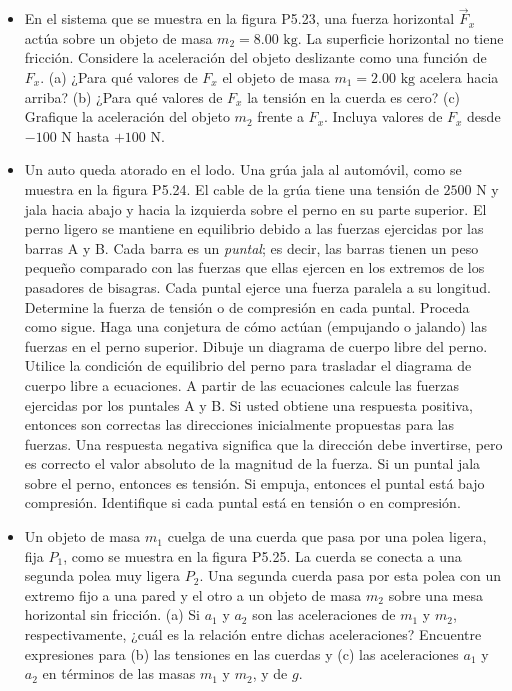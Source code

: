 \documentclass[11pt,a4paper]{article}
\begin{document}
\begin{itemize}
    \item[\textbf{23.}] En el sistema que se muestra en la figura P5.23, una fuerza horizontal $\vec{F}_x$ actúa sobre un objeto de masa $m_2 = 8.00 \text{ kg}$. La superficie horizontal no tiene fricción. Considere la aceleración del objeto deslizante como una función de $F_x$. (a) ¿Para qué valores de $F_x$ el objeto de masa $m_1 = 2.00 \text{ kg}$ acelera hacia arriba? (b) ¿Para qué valores de $F_x$ la tensión en la cuerda es cero? (c) Grafique la aceleración del objeto $m_2$ frente a $F_x$. Incluya valores de $F_x$ desde $-100 \text{ N}$ hasta $+100 \text{ N}$.
    \vspace*{7cm}

    \item[\textbf{24.}] Un auto queda atorado en el lodo. Una grúa jala al automóvil, como se muestra en la figura P5.24. El cable de la grúa tiene una tensión de $2500 \text{ N}$ y jala hacia abajo y hacia la izquierda sobre el perno en su parte superior. El perno ligero se mantiene en equilibrio debido a las fuerzas ejercidas por las barras A y B. Cada barra es un \textit{puntal}; es decir, las barras tienen un peso pequeño comparado con las fuerzas que ellas ejercen en los extremos de los pasadores de bisagras. Cada puntal ejerce una fuerza paralela a su longitud. Determine la fuerza de tensión o de compresión en cada puntal. Proceda como sigue. Haga una conjetura de cómo actúan (empujando o jalando) las fuerzas en el perno superior. Dibuje un diagrama de cuerpo libre del perno. Utilice la condición de equilibrio del perno para trasladar el diagrama de cuerpo libre a ecuaciones. A partir de las ecuaciones calcule las fuerzas ejercidas por los puntales A y B. Si usted obtiene una respuesta positiva, entonces son correctas las direcciones inicialmente propuestas para las fuerzas. Una respuesta negativa significa que la dirección debe invertirse, pero es correcto el valor absoluto de la magnitud de la fuerza. Si un puntal jala sobre el perno, entonces es tensión. Si empuja, entonces el puntal está bajo compresión. Identifique si cada puntal está en tensión o en compresión.
    \vspace*{8cm}

    \item[\textbf{25.}] Un objeto de masa $m_1$ cuelga de una cuerda que pasa por una polea ligera, fija $P_1$, como se muestra en la figura P5.25. La cuerda se conecta a una segunda polea muy ligera $P_2$. Una segunda cuerda pasa por esta polea con un extremo fijo a una pared y el otro a un objeto de masa $m_2$ sobre una mesa horizontal sin fricción. (a) Si $a_1$ y $a_2$ son las aceleraciones de $m_1$ y $m_2$, respectivamente, ¿cuál es la relación entre dichas aceleraciones? Encuentre expresiones para (b) las tensiones en las cuerdas y (c) las aceleraciones $a_1$ y $a_2$ en términos de las masas $m_1$ y $m_2$, y de $g$.
    \vspace*{8cm}
\end{itemize}
\end{document}

